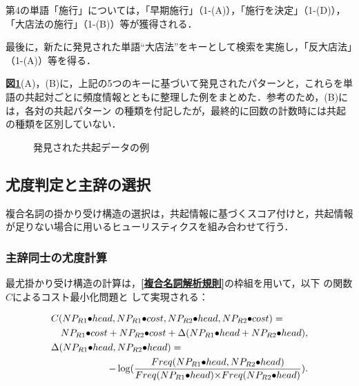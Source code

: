 第4の単語「施行」については，「早期施行」（1-(A)），「施行を決定」（1-(D)），「大店法の施行」（1-(B)）等が獲得される．

最後に，新たに発見された単語“大店法”をキーとして検索を実施し，「反大店法」（1-(A)）等を得る．

{\bf 図\ref{fig:DBexample}}(A)，(B)に，上記の5つのキーに基づいて発見されたパターンと，これらを単語の共起対ごとに頻度情報とともに整理した例をまとめた．参考のため，(B)には，各対の共起パターン\break
の種類を付記したが，最終的に回数の計数時には共起の種類を区別していない．
\begin{figure}[tbp]
  \begin{center}
    \leavevmode
  \end{center}
  \caption{発見された共起データの例}
  \label{fig:DBexample}
\end{figure}

\subsection{尤度判定と主辞の選択}\label{尤度判定と主辞の選択}
複合名詞の掛かり受け構造の選択は，共起情報に基づくスコア付けと，共起情報が足りない場合に用いるヒューリスティクスを組み合わせて行う．

\subsubsection{主辞同士の尤度計算}\label{主辞同士の尤度計算}
最尤掛かり受け構造の計算は，{\bf \ref{複合名詞解析規則}}の枠組を用いて，以下
の関数$C$によるコスト最小化問題と\break
して実現される：


\vspace{-0.5cm}

\begin{eqnarray*}
 \lefteqn{C(NP_{R1}{\bullet}head, NP_{R1}{\bullet}cost, NP_{R2}{\bullet}head, NP_{R2}{\bullet}cost) =} \\
 & & NP_{R1}{\bullet}cost + NP_{R2}{\bullet}cost + {\Delta}(NP_{R1}{\bullet}head + NP_{R2}{\bullet}head),\\
\lefteqn{{\Delta}(NP_{R1}{\bullet}head, NP_{R2}{\bullet}head) =} \\
 & & \displaystyle -\log(\frac{Freq(NP_{R1}{\bullet}head, NP_{R2}{\bullet}head)}{Freq(NP_{R1}{\bullet}head){\times}Freq(NP_{R2}{\bullet}head)}).\\
\end{eqnarray*}

\vspace{-0.5cm}

